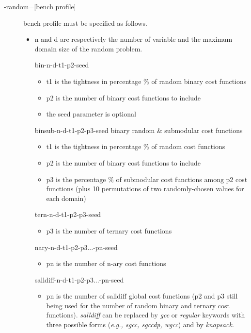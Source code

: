 \documentclass{article}
\begin{document}
\begin{description}
\item[{-random=[bench profile]}]
  bench profile must be specified as follows.
  \begin{itemize}
  \item n and d are respectively the number of variable and the
    maximum domain size of the random problem.
			
    bin-{n}-{d}-{t1}-{p2}-{seed}
    \begin{itemize}
    \item t1 is the tightness in percentage \% of random binary cost functions
    \item p2 is the number of binary cost functions to include
    \item the seed parameter is optional
    \end{itemize}   

    binsub-{n}-{d}-{t1}-{p2}-{p3}-{seed} binary random \& submodular cost functions       
    \begin{itemize}
      \item t1 is the tightness in percentage \% of random cost functions
      \item  p2 is the number of binary cost functions to include
      \item p3 is the percentage \% of submodular cost functions among p2 cost functions
        (plus 10 permutations of two randomly-chosen values for each domain)
      \end{itemize}
                                                                                   
       tern-{n}-{d}-{t1}-{p2}-{p3}-{seed} 
       \begin{itemize}
       \item p3 is the number of ternary cost functions
       \end{itemize}
       

      nary-{n}-{d}-{t1}-{p2}-{p3}...-{pn}-{seed}
       \begin{itemize}
       \item pn is the number of n-ary cost functions
       \end{itemize}

       salldiff-{n}-{d}-{t1}-{p2}-{p3}...-{pn}-{seed}  
       \begin{itemize}
       \item pn is the number of salldiff global cost functions (p2 and
         p3 still being used for the number of random binary and
         ternary cost functions). {\em salldiff} can be replaced by {\em gcc} or {\em regular} keywords with three possible forms ({\em e.g., sgcc, sgccdp, wgcc}) and by {\em knapsack}.
       \end{itemize}
     \end{itemize}
   \end{description}
    
\end{document}
